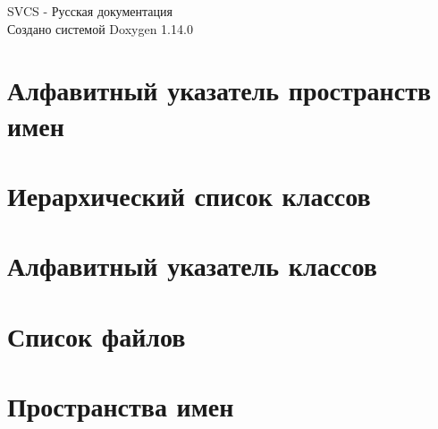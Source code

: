 \documentclass[twoside]{book}
\newcommand{\+}{\discretionary{\mbox{\scriptsize$\hookleftarrow$}}{}{}}
\newcommand{\clearemptydoublepage}{%
    \newpage{\pagestyle{empty}\cleardoublepage}%
  }
\begin{document}
  \raggedbottom
    \hypersetup{pageanchor=false,
                bookmarksnumbered=true,
                pdfencoding=unicode
               }
  \begin{titlepage}
  \vspace*{7cm}
  \begin{center}%
  {\Large SVCS -\/ Русская документация}\\
  \vspace*{1cm}
  {\large Создано системой Doxygen 1.14.0}\\
  \end{center}
  \end{titlepage}
  \clearemptydoublepage
  \tableofcontents
  \clearemptydoublepage
  \hypersetup{pageanchor=true}



\chapter{Алфавитный указатель пространств имен}

\chapter{Иерархический список классов}

\chapter{Алфавитный указатель классов}

\chapter{Список файлов}

\chapter{Пространства имен}

\end{document}
